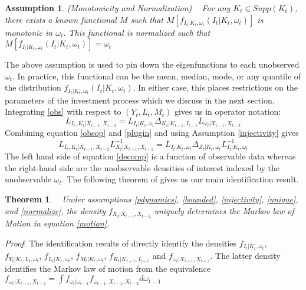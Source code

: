 \documentclass{article}
\newtheorem{assump}{Assumption}[section]
\newtheorem{theorem}{Theorem}[section]
\begin{document}
\begin{assump} (Monotonicity and Normalization) \label{normalize}
~
For any $K_{t}\in Supp(K_{t})$, there exists a known functional $M$ such that $M[f_{I_{t}|K_{t}, \omega_{t}}(I_{t}|K_{t}, \omega_{t})]$ is monotonic in $\omega_{t}$. This functional is normalized such that $M[f_{I_{t}|K_{t}, \omega_{t}}(I_{t}|K_{t}, \omega_{t})]=\omega_{t}$
\end{assump}
The above assumption is used to pin down the eigenfunctions to each unobserved $\omega_{t}$. In practice, this functional can be the mean, median, mode, or any quantile of the distribution $f_{I_{t}|K_{t}, \omega_{t}}(I_{t}|K_{t}, \omega_{t})$. In either case, this places restrictions on the parameters of the investment process which we discuss in the next section.\\

Integrating \eqref{obs} with respect to $(Y_{t}, L_{t}, M_{t})$ gives us in operator notation:
\begin{equation} \label{plugin}
L_{I_{t}, K_{t}|X_{t-1}, X_{t-2}}=L_{I_{t}|K_{t}, \omega_{t}}\Delta_{K_{t}|K_{t-1}, I_{t-1}}L_{\omega_{t}|X_{t-1}, X_{t-2}}
\end{equation}
Combining equation \eqref{obsop} and \eqref{plugin} and using Assumption \eqref{injectivity} gives
\begin{equation} \label{decomp}
L_{I_{t}, K_{t}|X_{t-1}, X_{t-2}}L^{-1}_{X_{t}|X_{t-1}, X_{t-2}}=L_{I_{t}|K_{t}, \omega_{t}}\Delta_{Z_{t}|K_{t}, \omega_{t}}L^{-1}_{I_{t}|K_{t}, \omega_{t}}
\end{equation}
The left hand side of equation \eqref{decomp} is a function of observable data whereas the right-hand side are the unobservable densities of interest indexed by the unobservable $\omega_{t}$. The following theorem of \cite{Hu2008} gives us our main identification result.\\

\begin{theorem} \label{identification}
~
Under assumptions \eqref{pdynamics}, \eqref{bounded}, \eqref{injectivity}, \eqref{unique}, and \eqref{normalize}, the density $f_{X_{t}|X_{t-1}, X_{t-2}}$ uniquely determines the Markov law of Motion in equation \eqref{motion}.
\end{theorem}

\textit{Proof}: The identification results of \cite{Hu2008} directly identify the densities $f_{I_{t}|K_{t}, \omega_{t}}$, $f_{Y_{t}|K_{t}, L_{t}, \omega_{t}}$, $f_{L_{t}|K_{t}, \omega_{t}}$, $f_{M_{t}|K_{t}, \omega_{t}}$, $f_{K_{t}|K_{t-1}, I_{t-1}}$ and $f_{\omega_{t}|X_{t-1}, X_{t-2}}$. The latter density identifies the Markov law of motion from the equivalence $f_{\omega_{t}|X_{t-1}, X_{t-2}}=\int f_{\omega_{t}|\omega_{t-1}}f_{\omega_{t-1}, X_{t-1}, X_{t-2}}d\omega_{t-1}$
\end{document}

